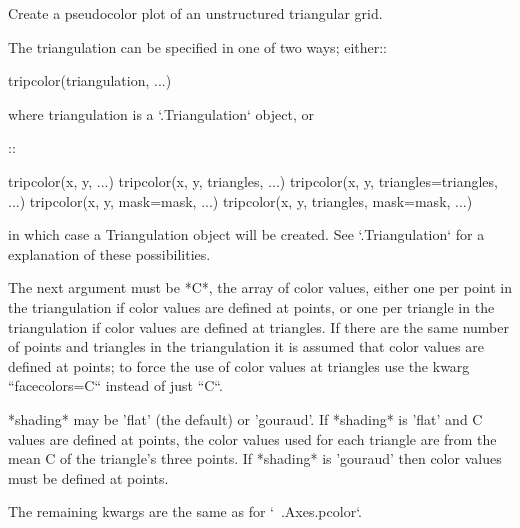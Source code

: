 \begin{DoxyVerb}Create a pseudocolor plot of an unstructured triangular grid.

The triangulation can be specified in one of two ways; either::

  tripcolor(triangulation, ...)

where triangulation is a `.Triangulation` object, or

::

  tripcolor(x, y, ...)
  tripcolor(x, y, triangles, ...)
  tripcolor(x, y, triangles=triangles, ...)
  tripcolor(x, y, mask=mask, ...)
  tripcolor(x, y, triangles, mask=mask, ...)

in which case a Triangulation object will be created.  See `.Triangulation`
for a explanation of these possibilities.

The next argument must be *C*, the array of color values, either
one per point in the triangulation if color values are defined at
points, or one per triangle in the triangulation if color values
are defined at triangles. If there are the same number of points
and triangles in the triangulation it is assumed that color
values are defined at points; to force the use of color values at
triangles use the kwarg ``facecolors=C`` instead of just ``C``.

*shading* may be 'flat' (the default) or 'gouraud'. If *shading*
is 'flat' and C values are defined at points, the color values
used for each triangle are from the mean C of the triangle's
three points. If *shading* is 'gouraud' then color values must be
defined at points.

The remaining kwargs are the same as for `~.Axes.pcolor`.
\end{DoxyVerb}
 